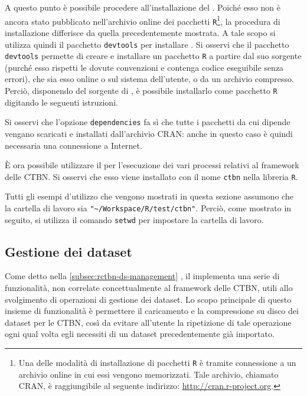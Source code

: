 A questo punto è possibile procedere all'installazione del \pacchettor{}. Poiché esso non è ancora stato pubblicato nell'archivio online dei pacchetti \lstinline$R$\footnote{Una delle modalità di installazione di pacchetti \lstinline$R$ è tramite connessione a un archivio online in cui essi vengono memorizzati. Tale archivio, chiamato \acf{CRAN}, è raggiungibile al seguente indirizzo: \url{http://cran.r-project.org}.}, la procedura di installazione differisce da quella precedentemente mostrata. A tale scopo si utilizza quindi il pacchetto \lstinline$devtools$ per installare \rctbn{}. Si osservi che il pacchetto \lstinline$devtools$ permette di creare e installare un pacchetto \lstinline$R$ a partire dal suo sorgente (purché esso rispetti le dovute convenzioni e contenga codice eseguibile senza errori), che sia esso online o sul sistema dell'utente, o da un archivio compresso. Perciò, disponendo del sorgente di \rctbn{}, è possibile installarlo come pacchetto \lstinline$R$ digitando le seguenti istruzioni.

\vspace*{8pt}

Si osservi che l'opzione \lstinline$dependencies$ fa sì che tutte i pacchetti da cui \rctbn{} dipende vengano scaricati e installati dall'archivio \acs{CRAN}: anche in questo caso è quindi necessaria una connessione a Internet.

\`E ora possibile utilizzare il \pacchettor{} per l'esecuzione dei vari processi relativi al framework delle \acs{CTBN}. Si osservi che esso viene installato con il nome \lstinline$ctbn$ nella libreria \lstinline$R$.

Tutti gli esempi d'utilizzo che vengono mostrati in questa sezione assumono che la cartella di lavoro sia \lstinline[language=rstats]{"~/Workspace/R/test/ctbn"}. Perciò, come mostrato in seguito, si utilizza il comando \lstinline$setwd$ per impostare la cartella di lavoro.

\subsection{Gestione dei dataset}
Come detto nella \autoref{subsec:rctbn-ds-management} , il \pacchettor{} implementa una serie di funzionalità, non correlate concettualmente al framework delle \acs{CTBN}, utili allo svolgimento di operazioni di gestione dei dataset. Lo scopo principale di questo insieme di funzionalità è permettere il caricamento e la compressione su disco dei dataset per le \acs{CTBN}, così da evitare all'utente la ripetizione di tale operazione ogni qual volta egli necessiti di un dataset precedentemente già importato.

